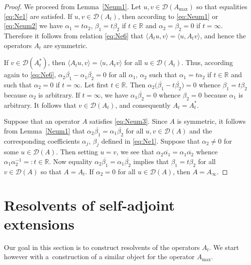 \documentclass[pdftex]{sigma}%
\numberwithin{equation}{section}
\begin{document}
 \begin{proof}
 We proceed from Lemma~\ref{Neum1}. Let $u,v \in{\mathcal D}(A_{\max})$ so that equalities \eqref{eq:Ne1} are satisfed.
 If $u,v \in{\mathcal D}(A_{t})$, then according to \eqref{eq:Neum1} or \eqref{eq:Neum2} we have $\alpha_{1}= t\alpha_{2}$, $\beta_{1}= t \beta_{2}$ if $t\in {\mathbb R}$ and $\alpha_2= \beta_{2}=0$ if $t=\infty$. Therefore it follows from relation \eqref{eq:Ne6} that $\langle A_{t}u,v \rangle= \langle u, A_{t} v \rangle$, and hence the operators $A_{t} $ are symmetric.

 If $v\in {\mathcal D}(A_{t}^*)$, then $\langle A_{t}u,v \rangle= \langle u, A_{t} v \rangle$ for all $u\in {\mathcal D}(A_{t})$.
 Thus, according again to \eqref{eq:Ne6}, $\alpha_{2} \overline{\beta_{1}}-\alpha_{1} \overline{\beta_{2}}=0$ for all $\alpha_{1}$, $\alpha_{2}$ such that $\alpha_{1}=t \alpha_{2}$ if $t\in {\mathbb R}$ and such that $ \alpha_{2}= 0$ if $t=\infty$.
 Let first $t\in {\mathbb R}$. Then $\alpha_{2} \big( \overline{\beta_{1}}- t \overline{\beta_{2}}\big)=0 $ whence $\beta_{1}=t\beta_{2}$ because $\alpha_{2}$ is arbitrary. If $t=\infty$, we have $\alpha_{1} \overline{\beta_{2}}=0$ whence $\beta_{2}=0$ because $\alpha_1$ is arbitrary. It follows that $v\in {\mathcal D}(A_{t})$, and consequently $A_{t}=A_{t}^*$.

Suppose that an operator $A$ satisfies \eqref{eq:Neum3}. Since $A$ is symmetric, it follows from Lemma~\ref{Neum1} that $\alpha_{2} \overline{\beta_{1}}=\alpha_{1} \overline{\beta_{2}}$ for all $u, v\in {\mathcal D} (A)$ and the corresponding coefficients $\alpha_{j}$, $\beta_{j}$ defined in \eqref{eq:Ne1}. Suppose that $\alpha_{2}\neq 0$ for some $u \in {\mathcal D} (A)$. Then setting $u=v$, we see that $\alpha_{2} \overline{\alpha_{1}}=\alpha_{1} \overline{\alpha_{2}}$ whence $ \alpha_{1}\alpha_{2}^{-1}=:t \in{\mathbb R}$. Now equality $\alpha_{2} \overline{\beta_{1}}=\alpha_{1} \overline{\beta_{2}}$ implies that
 $\beta_{1}= t \beta_{2}$ for all $v \in {\mathcal D} (A)$ so that $A=A_{t}$. If $\alpha_{2}= 0$ for all $u \in {\mathcal D} (A)$, then $A=A_\infty$.
 \end{proof}

\section{Resolvents of self-adjoint extensions}\label{section3}

 Our goal in this section is to construct resolvents of the operators $A_{t}$. We start however with a~construction of a similar object for the operator $A_{\max}$.
\end{document}
